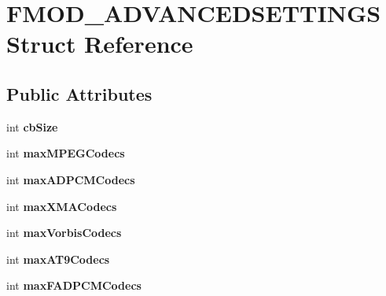 \hypertarget{structFMOD__ADVANCEDSETTINGS}{}\section{F\+M\+O\+D\+\_\+\+A\+D\+V\+A\+N\+C\+E\+D\+S\+E\+T\+T\+I\+N\+GS Struct Reference}
\label{structFMOD__ADVANCEDSETTINGS}
\subsection*{Public Attributes}
\begin{DoxyCompactItemize}
\item 
\mbox{\label{structFMOD__ADVANCEDSETTINGS_a262522129ac6c602b391138ba69659b9}} 
int {\bfseries cb\+Size}
\item 
\mbox{\label{structFMOD__ADVANCEDSETTINGS_a961b0224b4e3cfe7e0cc3a3ec5d2ca8c}} 
int {\bfseries max\+M\+P\+E\+G\+Codecs}
\item 
\mbox{\label{structFMOD__ADVANCEDSETTINGS_acfa5560db4bc9fd518a1c5f1f02bf5c9}} 
int {\bfseries max\+A\+D\+P\+C\+M\+Codecs}
\item 
\mbox{\label{structFMOD__ADVANCEDSETTINGS_aa0f823d02c14ef5fff96d882aa5fc1af}} 
int {\bfseries max\+X\+M\+A\+Codecs}
\item 
\mbox{\label{structFMOD__ADVANCEDSETTINGS_a22c9c6e32dd68468537741e6cfc4888f}} 
int {\bfseries max\+Vorbis\+Codecs}
\item 
\mbox{\label{structFMOD__ADVANCEDSETTINGS_a19bcd67cf21220fcba3c2c62e1d07ac7}} 
int {\bfseries max\+A\+T9\+Codecs}
\item 
\mbox{\label{structFMOD__ADVANCEDSETTINGS_a961aefcf1b30daff638ef0cef22e7fa5}} 
int {\bfseries max\+F\+A\+D\+P\+C\+M\+Codecs}
\item 
\mbox{\label{structFMOD__ADVANCEDSETTINGS_a7050190a9a6183cd3b61b7ffc9a31a88}} 

\end{DoxyCompactItemize}
